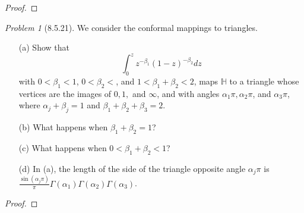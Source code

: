\documentclass[10pt]{article}
\newcommand{\sk}{\vskip 6mm}
\newcommand{\bb}[1]{\mathbb{#1}}
\theoremstyle{remark}
\newtheorem{problem}{Problem}
\theoremstyle{remark}
\begin{document}
\begin{proof}
  
\end{proof}

\sk

\begin{problem}[8.5.21]
  We consider the conformal mappings to triangles.
  \begin{enumerate}
  \item[(a)] Show that
    \[
      \int_0^z z^{-\beta_1}(1-z)^{-\beta_2}dz
    \]
    with $0<\beta_1<1$, $0<\beta_2<$, and $1<\beta_1+\beta_2<2$, maps $\bb{H}$
    to a triangle whose vertices are the images of $0,1,$ and
    $\infty$, and with angles $\alpha_1\pi,\alpha_2\pi$, and $\alpha_3\pi$,
    where $\alpha_j+\beta_j=1$ and $\beta_1+\beta_2+\beta_3=2$.
  \item[(b)] What happens when $\beta_1+\beta_2=1$?
  \item[(c)] What happens when $0<\beta_1+\beta_2<1$?
  \item[(d)] In (a), the length of the side of the triangle opposite angle
    $\alpha_j\pi$ is
    $\frac{\sin(\alpha_j\pi)}{\pi}\Gamma(\alpha_1)\Gamma(\alpha_2)\Gamma(\alpha_3)$.
  \end{enumerate}
\end{problem}

\begin{proof}
  
\end{proof}

\sk
\end{document}
